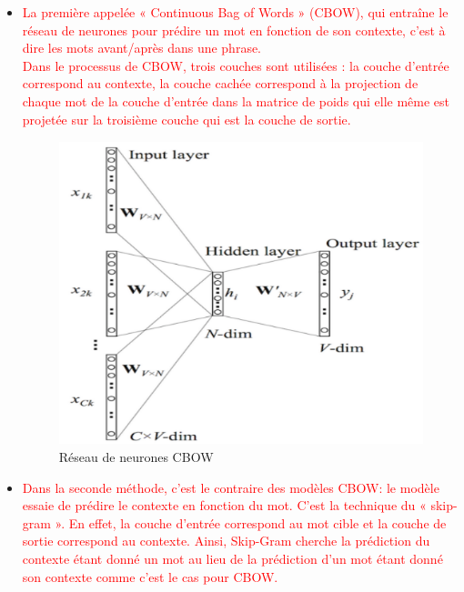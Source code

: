     \begin{itemize}
    \item  \textcolor{red}{La première appelée « Continuous Bag of Words » (CBOW), qui entraîne le réseau de neurones pour prédire un mot en fonction de son contexte, c’est à dire les mots avant/après dans une phrase.\\
    Dans le processus de CBOW, trois couches sont utilisées : la couche d'entrée correspond au contexte, la couche cachée correspond à la projection de chaque mot de la couche d'entrée dans la matrice de poids qui elle même  est projetée sur la troisième couche qui est la couche de sortie.\\ }
   
        \begin{figure}[H]
        	\centering
        	\includegraphics[height=250pt,width=300pt]{img/chapter2/Cbow.png}
            \caption{Réseau de neurones CBOW}
        \end{figure}
        
    
     \item  \textcolor{red}{Dans la seconde méthode, c'est le contraire des modèles CBOW: le modèle essaie de prédire le contexte en fonction du mot. C’est la technique du « skip-gram ». En effet, la couche d'entrée correspond au mot cible
     et la couche de sortie correspond au contexte. Ainsi, Skip-Gram cherche la prédiction du contexte étant donné un mot au lieu de la prédiction d'un mot étant donné son contexte comme c'est le cas pour CBOW.\\}
    

\end{itemize}
